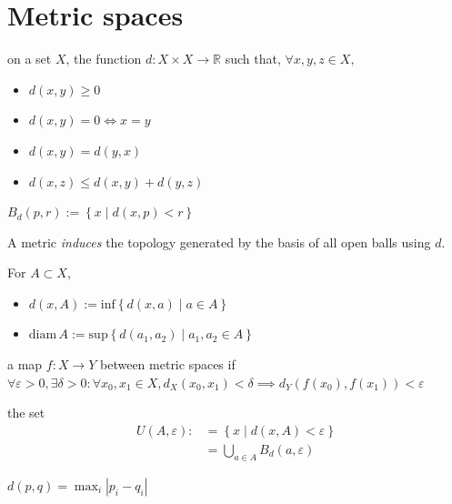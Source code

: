 \documentclass[tbtags,columns=2]{cheatsheet}
\begin{document}
\section{Metric spaces}
\begin{description}
    \item[metric] on a set $X$, the function $d:X \times X \to \mathbb{R}$ such that, $\forall x,y,z\in X,$ \begin{itemize}
        \item $d(x,y) \geq 0$
        \item $d(x,y) = 0 \iff x = y$
        \item $d(x,y)=d(y,x)$
        \item $d(x,z) \leq d(x,y)+d(y,z)$
    \end{itemize}
    \item[open ball] $B_d(p,r) := \left\{ x \mid d(x,p) < r  \right\}$
    \item A metric \emph{induces} the topology generated by the basis of all open balls using $d$.
    \item For $A \subset X$, \begin{itemize}
        \item $d(x,A):= \mathrm{inf}\left\{ d(x,a) \mid a \in A\right\}$
        \item $\mathrm{diam}\,A := \mathrm{sup}\left\{ d(a_{1},a_{2}) \mid a_{1},a_{2} \in A \right\}$
    \end{itemize}
    \item[uniformly continuous] a map $f:X\to Y$ between metric spaces if $\forall\varepsilon > 0, \exists\delta > 0: \forall x_0, x_1 \in X, d_X (x_0, x_1) < \delta \implies d_Y(f(x_0),f(x_1))<\varepsilon$
    \item[$\varepsilon$-neighborhood] the set $$\begin{aligned}
        U(A,\varepsilon) :\!\!&= \left\{ x \mid d(x,A) < \varepsilon \right\}\\
        &= \bigcup_{a \in A} B_d(a,\varepsilon)
    \end{aligned}$$
    \item[square metric] $d(p,q) = \max_i\left| p_i - q_i \right|$
\end{description}   
\end{document}
